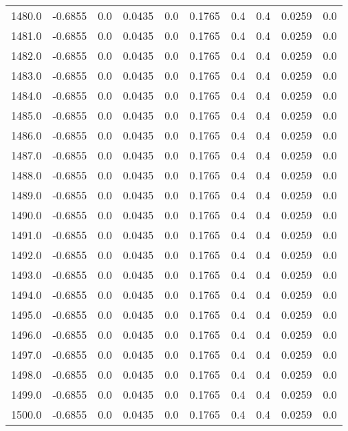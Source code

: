 \begin{longtable}{lrrrrrrrrr}
1480.0 & -0.6855 & 0.0 & 0.0435 & 0.0 & 0.1765 & 0.4 & 0.4 & 0.0259 & 0.0 \\
1481.0 & -0.6855 & 0.0 & 0.0435 & 0.0 & 0.1765 & 0.4 & 0.4 & 0.0259 & 0.0 \\
1482.0 & -0.6855 & 0.0 & 0.0435 & 0.0 & 0.1765 & 0.4 & 0.4 & 0.0259 & 0.0 \\
1483.0 & -0.6855 & 0.0 & 0.0435 & 0.0 & 0.1765 & 0.4 & 0.4 & 0.0259 & 0.0 \\
1484.0 & -0.6855 & 0.0 & 0.0435 & 0.0 & 0.1765 & 0.4 & 0.4 & 0.0259 & 0.0 \\
1485.0 & -0.6855 & 0.0 & 0.0435 & 0.0 & 0.1765 & 0.4 & 0.4 & 0.0259 & 0.0 \\
1486.0 & -0.6855 & 0.0 & 0.0435 & 0.0 & 0.1765 & 0.4 & 0.4 & 0.0259 & 0.0 \\
1487.0 & -0.6855 & 0.0 & 0.0435 & 0.0 & 0.1765 & 0.4 & 0.4 & 0.0259 & 0.0 \\
1488.0 & -0.6855 & 0.0 & 0.0435 & 0.0 & 0.1765 & 0.4 & 0.4 & 0.0259 & 0.0 \\
1489.0 & -0.6855 & 0.0 & 0.0435 & 0.0 & 0.1765 & 0.4 & 0.4 & 0.0259 & 0.0 \\
1490.0 & -0.6855 & 0.0 & 0.0435 & 0.0 & 0.1765 & 0.4 & 0.4 & 0.0259 & 0.0 \\
1491.0 & -0.6855 & 0.0 & 0.0435 & 0.0 & 0.1765 & 0.4 & 0.4 & 0.0259 & 0.0 \\
1492.0 & -0.6855 & 0.0 & 0.0435 & 0.0 & 0.1765 & 0.4 & 0.4 & 0.0259 & 0.0 \\
1493.0 & -0.6855 & 0.0 & 0.0435 & 0.0 & 0.1765 & 0.4 & 0.4 & 0.0259 & 0.0 \\
1494.0 & -0.6855 & 0.0 & 0.0435 & 0.0 & 0.1765 & 0.4 & 0.4 & 0.0259 & 0.0 \\
1495.0 & -0.6855 & 0.0 & 0.0435 & 0.0 & 0.1765 & 0.4 & 0.4 & 0.0259 & 0.0 \\
1496.0 & -0.6855 & 0.0 & 0.0435 & 0.0 & 0.1765 & 0.4 & 0.4 & 0.0259 & 0.0 \\
1497.0 & -0.6855 & 0.0 & 0.0435 & 0.0 & 0.1765 & 0.4 & 0.4 & 0.0259 & 0.0 \\
1498.0 & -0.6855 & 0.0 & 0.0435 & 0.0 & 0.1765 & 0.4 & 0.4 & 0.0259 & 0.0 \\
1499.0 & -0.6855 & 0.0 & 0.0435 & 0.0 & 0.1765 & 0.4 & 0.4 & 0.0259 & 0.0 \\
1500.0 & -0.6855 & 0.0 & 0.0435 & 0.0 & 0.1765 & 0.4 & 0.4 & 0.0259 & 0.0 \\
\end{longtable}
